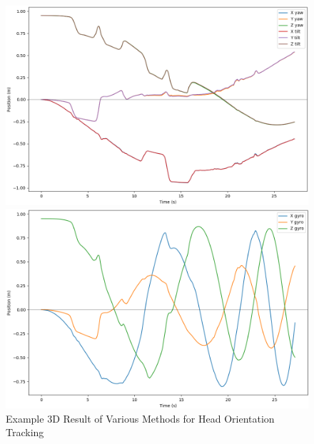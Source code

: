 \documentclass[11pt,a4paper]{article}
\begin{document}
	\begin{figure}[h!]
		\centering
		\begin{minipage}{0.45\linewidth}
			\includegraphics[width=1.0\linewidth]{figures/Position_Tracking_2D_Yaw_Tilt}
		\end{minipage}
		\begin{minipage}{0.45\linewidth}
			\includegraphics[width=1.0\linewidth]{figures/Position_Tracking_2D_Gyro}
		\end{minipage}		
		\caption{Example 3D Result of Various Methods for Head Orientation Tracking}
		\label{Position_2D}
	\end{figure}
\end{document}
